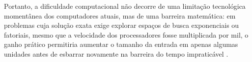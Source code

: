Portanto, a dificuldade computacional não decorre de uma limitação tecnológica momentânea dos computadores atuais, mas de uma barreira matemática: em problemas cuja solução exata exige explorar espaços de busca exponenciais ou fatoriais, mesmo que a velocidade dos processadores fosse multiplicada por mil, o ganho prático permitiria aumentar o tamanho da entrada em apenas algumas unidades antes de esbarrar novamente na barreira do tempo impraticável \cite{feofiloff2009, cormen2012}.
